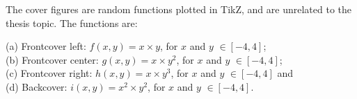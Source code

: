 \documentclass[10pt]{article}
\begin{document}
\vspace{0.5cm}
\noindent The cover figures are random functions plotted in TikZ, and are unrelated to the\\thesis topic. The functions are:\\
\vspace{0.5cm}

\noindent (a) Frontcover left: $f(x,y)=x\times y$, for $x$ and $y$ $\in [-4,4]$;\\
(b) Frontcover center: $g(x,y)=x\times y^2$, for $x$ and $y$ $\in [-4,4]$;\\
(c) Frontcover right: $h(x,y)=x\times y^3$, for $x$ and $y$ $\in [-4,4]$ and\\
(d) Backcover: $i(x,y)=x^2\times y^2$, for $x$ and $y$ $\in [-4,4]$.
\end{document}
